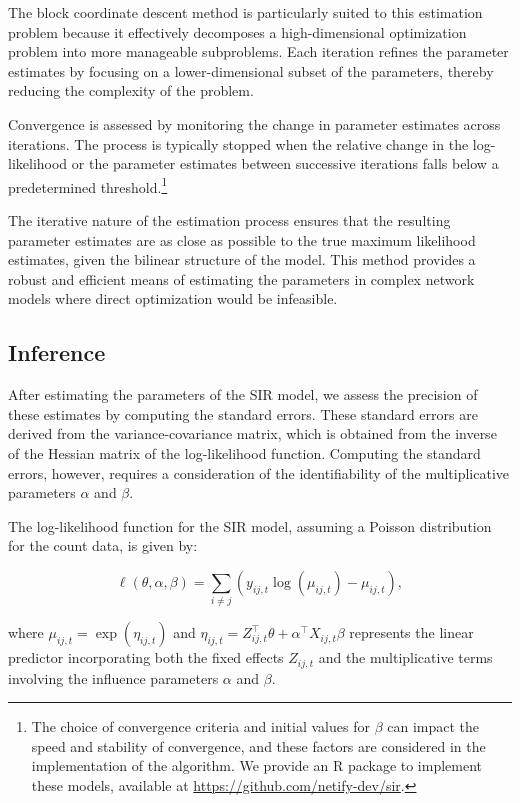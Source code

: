 The block coordinate descent method is particularly suited to this estimation problem because it effectively decomposes a high-dimensional optimization problem into more manageable subproblems. Each iteration refines the parameter estimates by focusing on a lower-dimensional subset of the parameters, thereby reducing the complexity of the problem.

Convergence is assessed by monitoring the change in parameter estimates across iterations. The process is typically stopped when the relative change in the log-likelihood or the parameter estimates between successive iterations falls below a predetermined threshold.\footnote{The choice of convergence criteria and initial values for $\beta$ can impact the speed and stability of convergence, and these factors are considered in the implementation of the algorithm. We provide an \textsf{R} package to implement these models, available at \url{https://github.com/netify-dev/sir}.}

The iterative nature of the estimation process ensures that the resulting parameter estimates are as close as possible to the true maximum likelihood estimates, given the bilinear structure of the model. This method provides a robust and efficient means of estimating the parameters in complex network models where direct optimization would be infeasible.

\subsection*{Inference}

After estimating the parameters of the SIR model, we assess the precision of these estimates by computing the standard errors. These standard errors are derived from the variance-covariance matrix, which is obtained from the inverse of the Hessian matrix of the log-likelihood function. Computing the standard errors, however, requires a consideration of the identifiability of the multiplicative parameters $ \alpha $ and $ \beta $.

The log-likelihood function for the SIR model, assuming a Poisson distribution for the count data, is given by:

\[
\ell(\theta, \alpha, \beta) = \sum_{i \neq j} \left( y_{ij,t} \log(\mu_{ij,t}) - \mu_{ij,t} \right),
\]

where $ \mu_{ij,t} = \exp(\eta_{ij,t}) $ and $ \eta_{ij,t} = Z_{ij,t}^\top \theta + \alpha^\top X_{ij,t} \beta $ represents the linear predictor incorporating both the fixed effects $Z_{ij,t}$ and the multiplicative terms involving the influence parameters $\alpha$ and $\beta$.

